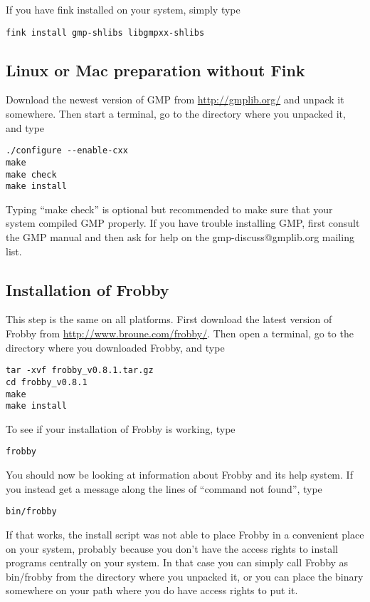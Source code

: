 \documentclass{amsart}
\theoremstyle{definition}
\begin{document}
If you have fink installed on your system, simply type

\begin{verbatim}
fink install gmp-shlibs libgmpxx-shlibs
\end{verbatim}

\subsection{Linux or Mac preparation without Fink}

Download the newest version of GMP from \url{http://gmplib.org/} and
unpack it somewhere. Then start a terminal, go to the directory where
you unpacked it, and type

\begin{verbatim}
./configure --enable-cxx
make
make check
make install
\end{verbatim}

Typing ``make check'' is optional but recommended to make sure that
your system compiled GMP properly. If you have trouble installing GMP,
first consult the GMP manual and then ask for help on the
gmp-discuss@gmplib.org mailing list.

\subsection{Installation of Frobby}

This step is the same on all platforms. First download the latest
version of Frobby from \url{http://www.broune.com/frobby/}. Then open
a terminal, go to the directory where you downloaded Frobby, and type
\begin{verbatim}
tar -xvf frobby_v0.8.1.tar.gz
cd frobby_v0.8.1
make
make install
\end{verbatim}

To see if your installation of Frobby is working, type
\begin{verbatim}
frobby
\end{verbatim}
You should now be looking at information about Frobby and its help
system. If you instead get a message along the lines of ``command not
found'', type
\begin{verbatim}
bin/frobby
\end{verbatim}
If that works, the install script was not able to place Frobby in a
convenient place on your system, probably because you don't have the
access rights to install programs centrally on your system. In that
case you can simply call Frobby as bin/frobby from the directory where
you unpacked it, or you can place the binary somewhere on your path
where you do have access rights to put it.
\end{document}
